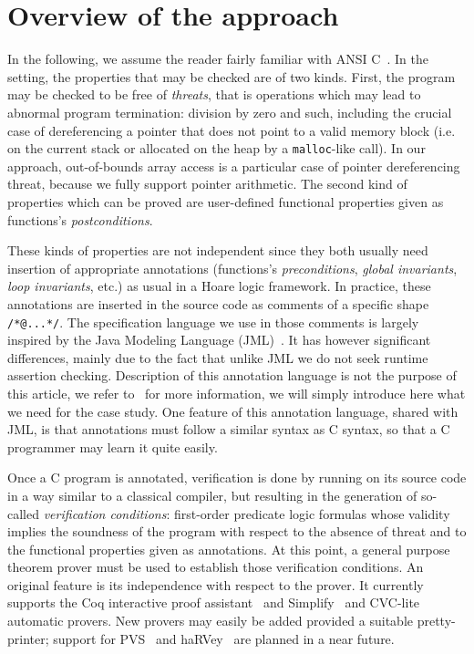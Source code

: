 \section{Overview of the \caduceus{} approach}
\label{sec:overview}

In the following, we assume the reader fairly familiar with ANSI
C~\cite{KR88}.  In the \caduceus{} setting, the properties that may be
checked are of two kinds. First, the program may be checked to be free
of \emph{threats}, that is operations which may lead to abnormal
program termination: division by zero and such, including the crucial
case of dereferencing a pointer that does not point to a valid memory
block (i.e. on the current stack or allocated on the heap by a
\texttt{malloc}-like call). In our approach, out-of-bounds array
access is a particular case of pointer dereferencing threat, because
we fully support pointer arithmetic.  The second kind of properties
which can be proved are user-defined functional properties given as
functions's \emph{postconditions}.

These kinds of properties are not independent since they both usually
need insertion of appropriate annotations (functions's
\emph{preconditions}, \emph{global invariants}, \emph{loop
  invariants}, etc.) as usual in a Hoare logic framework.  In
practice, these annotations are inserted in the source code as
comments of a specific shape \verb!/*@...*/!. The specification
language we use in those comments is largely inspired by the Java
Modeling Language (JML)~\cite{leavens00jml}. It has however
significant differences, mainly due to the fact that unlike JML we do
not seek runtime assertion checking. Description of this annotation
language is not the purpose of this article, we refer
to~\cite{Caduceus,filliatre04icfem} for more information, we will
simply introduce here what we need for the case study.
One feature of this annotation language, shared with JML, is that
annotations must follow a similar syntax as C syntax, so that a C
programmer may learn it quite easily.
 
Once a C program is annotated, verification is done by running
\caduceus{} on its source code in a way similar to a classical
compiler, but resulting in the generation of so-called
\emph{verification conditions}: first-order predicate logic formulas
whose validity implies the soundness of the program with respect to
the absence of threat and to the functional properties given as
annotations. At this point, a general purpose theorem prover must be
used to establish those verification conditions.  An original
\caduceus{} feature is its independence with respect to the prover. It
currently supports the Coq interactive proof
assistant~\cite{CoqProofAssistant} and Simplify~\cite{simplify} and
CVC-lite~\cite{cvclite} automatic provers. New provers may easily be
added provided a suitable pretty-printer; support for PVS~\cite{PVS}
and haRVey~\cite{ranise03harvey} are planned in a near future.

